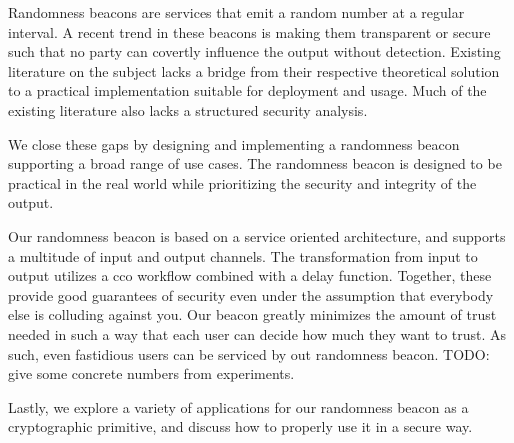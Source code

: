 Randomness beacons are services that emit a random number at a regular interval.
A recent trend in these beacons is making them transparent or secure such that no party can covertly influence the output without detection.
Existing literature on the subject lacks a bridge from their respective theoretical solution to a practical implementation suitable for deployment and usage.
Much of the existing literature also lacks a structured security analysis.

We close these gaps by designing and implementing a randomness beacon supporting a broad range of use cases.
The randomness beacon is designed to be practical in the real world while prioritizing the security and integrity of the output.

Our randomness beacon is based on a service oriented architecture, and supports a multitude of input and output channels.
The transformation from input to output utilizes a \gls{cco} workflow combined with a delay function.
Together, these provide good guarantees of security even under the assumption that everybody else is colluding against you.
Our beacon greatly minimizes the amount of trust needed in such a way that each user can decide how much they want to trust.
As such, even fastidious users can be serviced by out randomness beacon.
TODO: give some concrete numbers from experiments.

Lastly, we explore a variety of applications for our randomness beacon as a cryptographic primitive, and discuss how to properly use it in a secure way.

\glsresetall
